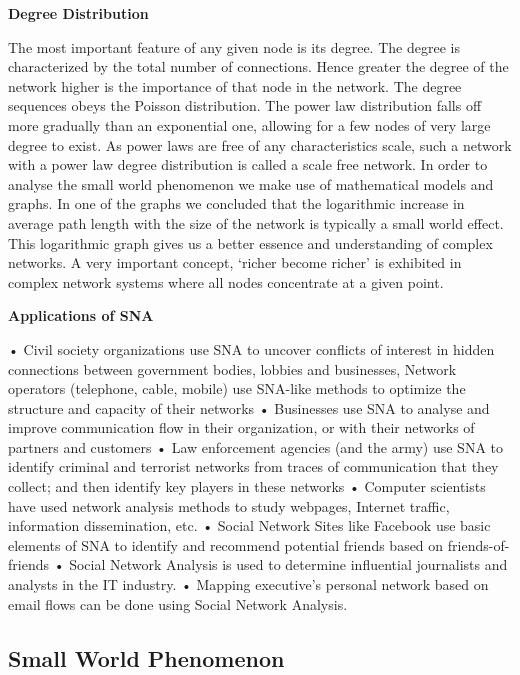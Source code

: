 {\bf Degree Distribution} 

The most important feature of any given node is its degree. The degree is characterized by the total number of connections. Hence greater the degree of the network higher is the importance of that node in the network. The degree sequences obeys the Poisson distribution. The power law distribution falls off more gradually than an exponential one, allowing for a few nodes of very large degree to exist. As power laws are free of any characteristics scale, such a network with a power law degree distribution is called a scale free network. In order to analyse the small world phenomenon we make use of mathematical models and graphs. In one of the graphs we concluded that the logarithmic increase in average path length with the size of the network is typically a small world effect. This logarithmic graph gives us a better essence and understanding of complex networks. A very important concept, `richer become richer' is exhibited in complex network systems where all nodes concentrate at a given point.

{\bf Applications of SNA}

• Civil society organizations use SNA to uncover conflicts of interest in hidden connections between government bodies, lobbies and businesses, Network operators (telephone, cable, mobile) use SNA-like methods to optimize the structure and capacity of their networks
• Businesses use SNA to analyse and improve communication flow in their organization, or with their networks of partners and customers
• Law enforcement agencies (and the army) use SNA to identify criminal and terrorist networks from traces of communication that they collect; and then identify key players in these networks
• Computer scientists have used network analysis methods to study webpages, Internet traffic, information dissemination, etc.
• Social Network Sites like Facebook use basic elements of SNA to identify and recommend potential friends based on friends-of-friends
• Social Network Analysis is used to determine influential journalists and analysts in the IT industry.
• Mapping executive’s personal network based on email flows can be done using Social Network Analysis.



\subsection{Small World Phenomenon}

